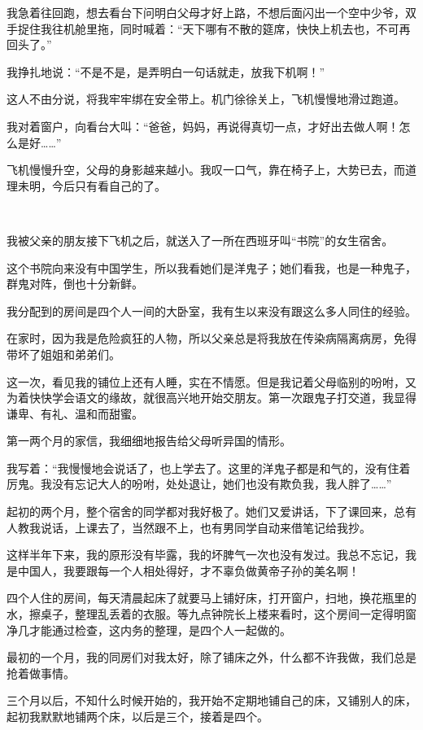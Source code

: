 \par 我急着往回跑，想去看台下问明白父母才好上路，不想后面闪出一个空中少爷，双手捉住我往机舱里拖，同时喊着：“天下哪有不散的筵席，快快上机去也，不可再回头了。”
\par 我挣扎地说：“不是不是，是弄明白一句话就走，放我下机啊！”
\par 这人不由分说，将我牢牢绑在安全带上。机门徐徐关上，飞机慢慢地滑过跑道。
\par 我对着窗户，向看台大叫：“爸爸，妈妈，再说得真切一点，才好出去做人啊！怎么是好……”
\par 飞机慢慢升空，父母的身影越来越小。我叹一口气，靠在椅子上，大势已去，而道理未明，今后只有看自己的了。
\par  
\par 我被父亲的朋友接下飞机之后，就送入了一所在西班牙叫“书院”的女生宿舍。
\par 这个书院向来没有中国学生，所以我看她们是洋鬼子；她们看我，也是一种鬼子，群鬼对阵，倒也十分新鲜。
\par 我分配到的房间是四个人一间的大卧室，我有生以来没有跟这么多人同住的经验。
\par 在家时，因为我是危险疯狂的人物，所以父亲总是将我放在传染病隔离病房，免得带坏了姐姐和弟弟们。
\par 这一次，看见我的铺位上还有人睡，实在不情愿。但是我记着父母临别的吩咐，又为着快快学会语文的缘故，就很高兴地开始交朋友。第一次跟鬼子打交道，我显得谦卑、有礼、温和而甜蜜。
\par 第一两个月的家信，我细细地报告给父母听异国的情形。
\par 我写着：“我慢慢地会说话了，也上学去了。这里的洋鬼子都是和气的，没有住着厉鬼。我没有忘记大人的吩咐，处处退让，她们也没有欺负我，我人胖了……”
\par 起初的两个月，整个宿舍的同学都对我好极了。她们又爱讲话，下了课回来，总有人教我说话，上课去了，当然跟不上，也有男同学自动来借笔记给我抄。
\par 这样半年下来，我的原形没有毕露，我的坏脾气一次也没有发过。我总不忘记，我是中国人，我要跟每一个人相处得好，才不辜负做黄帝子孙的美名啊！
\par 四个人住的房间，每天清晨起床了就要马上铺好床，打开窗户，扫地，换花瓶里的水，擦桌子，整理乱丢着的衣服。等九点钟院长上楼来看时，这个房间一定得明窗净几才能通过检查，这内务的整理，是四个人一起做的。
\par 最初的一个月，我的同房们对我太好，除了铺床之外，什么都不许我做，我们总是抢着做事情。
\par 三个月以后，不知什么时候开始的，我开始不定期地铺自己的床，又铺别人的床，起初我默默地铺两个床，以后是三个，接着是四个。
